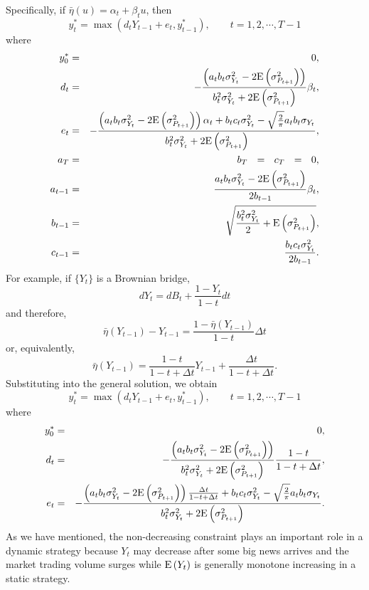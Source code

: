 Specifically, if $\bar \eta(u)=\alpha_t+\beta_t u$, then
\[ %
  y_t^*= \max(d_tY_{t-1}+e_t, y_{t-1}^*), \qquad t = 1,2,\cdots,T-1
\] %
where 
\begin{eqnarray*}
  y_0^* & = & 0,\\
  d_t & = & -\frac{\left(a_tb_t\sigma_{Y_t}^2-
2{\mathrm{E}}\left( \sigma_{P_{t+1}}^2 \right)\right)}{b_t^2 
\sigma_{Y_t}^2+2{\mathrm{E}}\left( \sigma_{P_{t+1}}^2 \right)}\beta_t,\\
  e_t & = & -\frac{\left(a_tb_t\sigma_{Y_t}^2-
2{\mathrm{E}}\left( \sigma_{P_{t+1}}^2 \right)\right)\alpha_t+b_tc_t\sigma_{Y_t}^2-
\sqrt{\frac{2}{\pi}}a_tb_t\sigma_{Y_t}}{b_t^2 
\sigma_{Y_t}^2+2{\mathrm{E}}\left( \sigma_{P_{t+1}}^2 \right)},\\
  a_T & = & b_T \ \ = \ \ c_T \ \ = \ \ 0,\\
  a_{t-1} & = & \frac{a_tb_t\sigma_{Y_t}^2-2{\mathrm{E}}\left( \sigma_{P_{t+1}}^2 \right)}{2b_{t-
1}}\beta_t,\\
  b_{t-1} & = & \sqrt{\frac{b_t^2 \sigma_{Y_t}^2}{2}+{\mathrm{E}}\left( \sigma_{P_{t+1}}^2 \right)},\\
  c_{t-1} & = & \frac{b_tc_t\sigma_{Y_t}^2}{2b_{t-1}}.
\end{eqnarray*}
For example, if $\{ Y_t \}$ is a Brownian bridge, 
\[ %
dY_t=dB_t+\frac{1-Y_t}{1-t}dt
\] %
and therefore,
\[ %
\bar \eta(Y_{t-1})-Y_{t-1}=\frac{1-\bar \eta(Y_{t-1})}{1-t} \Delta t
\] %
or, equivalently,
\[ %
\bar \eta(Y_{t-1})=\frac{1-t}{1-t+\Delta t}Y_{t-1}+\frac{\Delta t}{1-t+\Delta 
t}. 
\] %
Substituting into the general solution, we obtain
\[ %
 y_t^* = \max(d_tY_{t-1}+e_t,y_{t-1}^*), \qquad t = 1,2,\cdots,T-1
\] %
where 
\begin{eqnarray*}
  y_0^* & = & 0,\\
  d_t & = & -\frac{\left(a_tb_t\sigma_{Y_t}^2-
2{\mathrm{E}}\left( \sigma_{P_{t+1}}^2 \right)\right)}{b_t^2 
\sigma_{Y_t}^2+2{\mathrm{E}}\left( \sigma_{P_{t+1}}^2 \right)}\frac{1-t}{1-t+\Delta t},\\
  e_t & = & -\frac{\left(a_tb_t\sigma_{Y_t}^2-2{\mathrm{E}}\left( \sigma_{P_{t+1}}^2 \right)\right)\frac{\Delta t}{1-t+\Delta 
t}+b_tc_t\sigma_{Y_t}^2-\sqrt{\frac{2}{\pi}}a_tb_t\sigma_{Y_t}}{b_t^2 
\sigma_{Y_t}^2+2{\mathrm{E}}\left( \sigma_{P_{t+1}}^2 \right)}.
\end{eqnarray*}
As we have mentioned, the non-decreasing constraint plays an important role in a 
dynamic strategy because $Y_t$ may decrease after some big news arrives and the 
market trading volume surges while ${\mathrm{E}}\left( Y_t \right)$ is generally monotone increasing 
in a static strategy.

